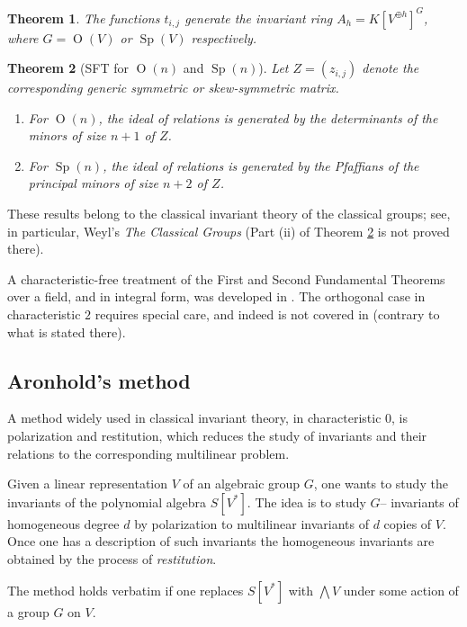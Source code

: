 \documentclass[10pt]{amsart}
\newtheorem{theorem}{Theorem}[section]
\theoremstyle{definition}
\theoremstyle{remark}
\newcommand{\Sp}{\operatorname{Sp}}
\newcommand{\OO}{\operatorname{O}}
\begin{document}
\begin{theorem}
The functions $t_{i,j}$ generate the invariant ring $A_h=K[V^{\oplus h}]^G$, where $G=\OO(V)$ or $\Sp(V)$ respectively.
\end{theorem}

\begin{theorem}[SFT for $\OO(n)$ and $\Sp(n)$]\label{FOG}
Let $Z=(z_{i,j})$ denote the corresponding generic symmetric or skew-symmetric matrix.
\begin{enumerate}[label=\textnormal{(\roman*)}]
\item For $\OO(n)$, the ideal of relations is generated by the determinants of the minors of size $n+1$ of $Z$.
\item For $\Sp(n)$, the ideal of relations is generated by the Pfaffians of the principal minors of size $n+2$ of $Z$.
\end{enumerate}
\end{theorem}

These results belong to the classical invariant theory of the classical groups; see, in particular, Weyl's \emph{The Classical Groups} \cite{Weyl} (Part  (ii) of Theorem \ref{FOG} is not proved there). \smallskip

 A characteristic-free treatment of the First and Second Fundamental Theorems over a  field, and in integral form, was developed in \cite{DeConciniProcesi1976}.  The orthogonal case in characteristic $2$ requires special care, and indeed is not covered in \cite{DeConciniProcesi1976} (contrary to what is stated there).


\subsection{Aronhold's method}  A method widely used in classical invariant theory, in characteristic 0,   is  polarization and restitution,  which reduces the study of invariants  and their relations  to the corresponding multilinear problem.
\smallskip

Given a linear representation $V$  of an algebraic group $G$, one wants to study the invariants of the polynomial algebra $S[V^*]$. The idea is to study $G$-- invariants of homogeneous degree $d$ by polarization to multilinear invariants of $d$  copies of $V$. Once one has a description of such invariants the homogeneous invariants are obtained by the process of {\em restitution}.\smallskip



The method holds verbatim  if one replaces $S[V^*]$ with $\bigwedge  V  $ under some action of a group $G$ on $V$.  
\end{document}
